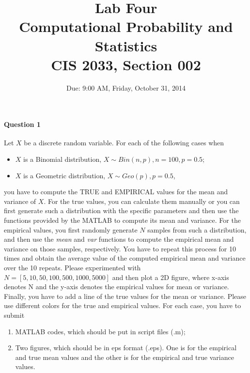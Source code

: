 \documentclass[11pt]{article} %
\title{Lab Four\\
Computational Probability and Statistics \\
CIS 2033, Section 002}
\author{Due: 9:00 AM, Friday, October 31, 2014}
\date{} %
\begin{document}
\maketitle

\paragraph*{Question 1}
Let $X$ be a discrete random variable. For each of the following cases when
\begin{itemize}
\item $X$ is a Binomial distribution, $X \sim Bin(n, p), n = 100, p = 0.5$;
\item $X$ is a Geometric distribution, $X \sim Geo(p), p = 0.5$,
\end{itemize}
you have to compute the TRUE and EMPIRICAL values for the mean and variance of $X$. For the true values, you can calculate them manually or you can first generate such a distribution with the specific parameters and then use the functions provided by the MATLAB to compute its mean and variance. For the empirical values, you first randomly generate $N$ samples from such a distribution, and then use the {\it mean} and {\it var} functions to compute the empirical mean and variance on those samples, respectively. You have to repeat this process for 10 times and obtain the average value of the computed empirical mean and variance over the 10 repeats. Please experimented with $N = [5,10,50,100,500,1000,5000]$ and then plot a 2D figure, where x-axis denotes N and the y-axis denotes the empirical values for mean or variance. Finally, you have to add a line of the true values for the mean or variance. Please use different colors for the true and empirical values. 
For each case, you have to submit 
\begin{enumerate}
\item MATLAB codes, which should be put in script files (.m); 
\item Two figures, which should be in eps format (.eps). One is for the empirical and true mean values and the other is for the empirical and true variance values. 
\end{enumerate}
\end{document}

